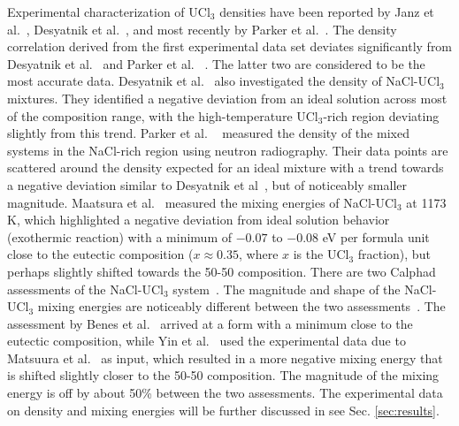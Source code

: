 \documentclass[preprint,3p,10pt,onecolumn,number,sort&compress]{elsarticle}
\begin{document}

Experimental characterization of UCl$_3$ densities have been reported by Janz et al.~\cite{Janz1988}, Desyatnik et al.~\cite{Desyatnik}, and most recently by Parker et al.~\cite{Parker}. The density correlation derived from the first experimental data set deviates significantly from Desyatnik et al.~\cite{Desyatnik} and Parker et al. ~\cite{Parker}. The latter two are considered to be the most accurate data.
Desyatnik et al.~\cite{Desyatnik} also investigated the density of NaCl-UCl$_3$ mixtures. They identified a negative deviation from an ideal solution across most of the composition range, with the high-temperature UCl$_3$-rich region deviating slightly from this trend. Parker et al. ~\cite{Parker} measured the density of the mixed systems in the NaCl-rich region using neutron radiography. Their data points are scattered around the density expected for an ideal mixture with a trend towards a negative deviation similar to Desyatnik et al~\cite{Desyatnik}, but of noticeably smaller magnitude.
Maatsura et al.~\cite{Matsuura} measured the mixing energies of NaCl-UCl$_3$ at 1173 K, which highlighted a negative deviation from ideal solution behavior (exothermic reaction) with a minimum of $-0.07$ to $-0.08$ eV per formula unit close to the eutectic composition ($x\approx 0.35$, where $x$ is the UCl$_3$ fraction), but perhaps slightly shifted towards the 50-50 composition. There are two Calphad assessments of the NaCl-UCl$_3$ system~\cite{BENES2008, YIN2020}. The magnitude and shape of the NaCl-UCl$_3$ mixing energies are noticeably different between the two assessments~\cite{YIN2020}. The assessment by Benes et al.~\cite{BENES2008} arrived at a form with a minimum close to the eutectic composition, while Yin et al.~\cite{YIN2020} used the experimental data due to Matsuura et al.~\cite{Matsuura} as input, which resulted in a more negative mixing energy that is shifted slightly closer to the 50-50 composition. The magnitude of the mixing energy is off by about 50\% between the two assessments. The experimental data on density and mixing energies will be further discussed in see Sec. \ref{sec:results}.
\end{document}
